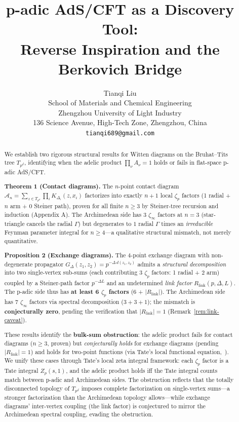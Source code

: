 \documentclass[11pt,a4paper]{article}
\title{\Large \bfseries p-adic AdS/CFT as a Discovery Tool: \\
Reverse Inspiration and the Berkovich Bridge}
\author{
    \large Tianqi Liu\\[4pt]
    \normalsize School of Materials and Chemical Engineering\\
    Zhengzhou University of Light Industry\\
    136 Science Avenue, High-Tech Zone, Zhengzhou, China\\[4pt]
    \normalsize \texttt{tianqi689@gmail.com}
}
\date{}
\begin{document}
\maketitle

\begin{abstract}
\noindent
We establish two rigorous structural results for Witten diagrams on the Bruhat--Tits tree $T_{p^d}$, identifying when the adelic product $\prod_\nu A_\nu = 1$ holds or fails in flat-space p-adic AdS/CFT.

\medskip
\noindent
\textbf{Theorem 1 (Contact diagrams).} The $n$-point contact diagram $\mathcal{A}_n = \sum_{z \in T_{p^d}} \prod_i K_{\Delta_i}(z, x_i)$ factorizes into exactly $n{+}1$ local $\zeta_p$ factors (1 radial + $n$ arm + 0 Steiner path), proven for all finite $n \geq 3$ by Steiner-tree recursion and induction (Appendix A). The Archimedean side has $3$ $\zeta_\infty$ factors at $n=3$ (star-triangle cancels the radial $\Gamma$) but degenerates to $1$ radial $\Gamma$ times an \emph{irreducible} Feynman parameter integral for $n \geq 4$---a qualitative structural mismatch, not merely quantitative.

\medskip
\noindent
\textbf{Proposition 2 (Exchange diagrams).} The 4-point exchange diagram with non-degenerate propagator $G_\Delta(z_1, z_2) = p^{-\Delta\,d(z_1,z_2)}$ admits a \emph{structural decomposition} into two single-vertex sub-sums (each contributing 3 $\zeta_p$ factors: 1 radial + 2 arm) coupled by a Steiner-path factor $p^{-\Delta L}$ and an undetermined \emph{link factor} $R_{\mathrm{link}}(p, \Delta, L)$. The p-adic side thus has \textbf{at least 6 $\zeta_p$ factors} (6 + $|R_{\mathrm{link}}|$). The Archimedean side has $7$ $\zeta_\infty$ factors via spectral decomposition ($3 + 3 + 1$); the mismatch is \textbf{conjecturally zero}, pending the verification that $|R_{\mathrm{link}}| = 1$ (Remark~\ref{rem:link-caveat}).

\medskip
\noindent
These results identify the \textbf{bulk-sum obstruction}: the adelic product fails for contact diagrams ($n \geq 3$, proven) but \emph{conjecturally holds} for exchange diagrams (pending $|R_{\mathrm{link}}| = 1$) and holds for two-point functions (via Tate's local functional equation,~\cite{HSYZ20}). We unify these cases through Tate's local zeta integral framework: each $\zeta_p$ factor is a Tate integral $Z_p(s, 1)$, and the adelic product holds iff the Tate integral counts match between p-adic and Archimedean sides. The obstruction reflects that the totally disconnected topology of $T_{p^d}$ imposes complete factorization on single-vertex sums---a stronger factorization than the Archimedean topology allows---while exchange diagrams' inter-vertex coupling (the link factor) is conjectured to mirror the Archimedean spectral coupling, evading the obstruction.
\end{abstract}
\end{document}
